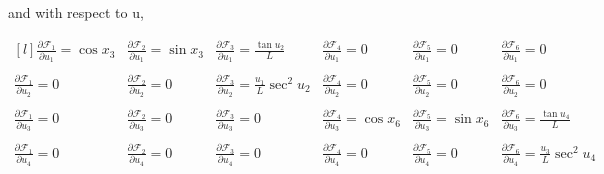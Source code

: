 \documentclass[paper=a4, fontsize=11pt]{scrartcl} %
\numberwithin{equation}{section} %
\numberwithin{figure}{section} %
\numberwithin{table}{section} %
\begin{document}
\begin{framed}
and with respect to u,

\[ \begin{matrix*}[l]
\frac{\partial\mathcal{F}_1}{\partial u_1} = \cos{x_3} &
\frac{\partial\mathcal{F}_2}{\partial u_1} = \sin{x_3} & 
\frac{\partial\mathcal{F}_3}{\partial u_1} = \frac{\tan{u_2}}{L} & 
\frac{\partial\mathcal{F}_4}{\partial u_1} = 0 & 
\frac{\partial\mathcal{F}_5}{\partial u_1} = 0 &  
\frac{\partial\mathcal{F}_6}{\partial u_1} = 0 & \\ \\
\frac{\partial\mathcal{F}_1}{\partial u_2} = 0 &
\frac{\partial\mathcal{F}_2}{\partial u_2} = 0 & 
\frac{\partial\mathcal{F}_3}{\partial u_2} = \frac{u_1}{L}\sec^2{u_2} & 
\frac{\partial\mathcal{F}_4}{\partial u_2} = 0 & 
\frac{\partial\mathcal{F}_5}{\partial u_2} = 0 &  
\frac{\partial\mathcal{F}_6}{\partial u_2} = 0 & \\ \\
\frac{\partial\mathcal{F}_1}{\partial u_3} = 0 &
\frac{\partial\mathcal{F}_2}{\partial u_3} = 0 & 
\frac{\partial\mathcal{F}_3}{\partial u_3} = 0 & 
\frac{\partial\mathcal{F}_4}{\partial u_3} = \cos{x_6} & 
\frac{\partial\mathcal{F}_5}{\partial u_3} = \sin{x_6} &  
\frac{\partial\mathcal{F}_6}{\partial u_3} = \frac{\tan{u_4}}{L} & \\ \\
\frac{\partial\mathcal{F}_1}{\partial u_4} = 0 &
\frac{\partial\mathcal{F}_2}{\partial u_4} = 0 & 
\frac{\partial\mathcal{F}_3}{\partial u_4} = 0 & 
\frac{\partial\mathcal{F}_4}{\partial u_4} = 0 & 
\frac{\partial\mathcal{F}_5}{\partial u_4} = 0 &  
\frac{\partial\mathcal{F}_6}{\partial u_4} = \frac{u_3}{L}\sec^2{u_4} & \\ \\
\end{matrix*}\]



\end{framed}
\end{document}
